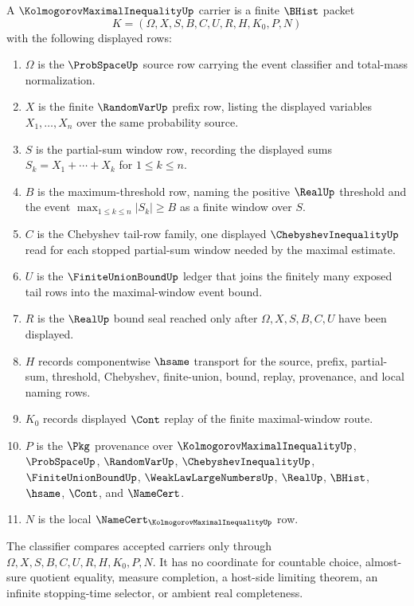 \begin{definition}
\label{def:kolmogorov-maximal-inequality-carrier}
A $\KolmogorovMaximalInequalityUp$ carrier is a finite $\BHist$ packet
$$
K=(\Omega,X,S,B,C,U,R,H,K_0,P,N)
$$
with the following displayed rows:
\begin{enumerate}
\item $\Omega$ is the $\ProbSpaceUp$ source row carrying the event classifier and total-mass normalization.
\item $X$ is the finite $\RandomVarUp$ prefix row, listing the displayed variables $X_1,\ldots,X_n$ over the same probability source.
\item $S$ is the partial-sum window row, recording the displayed sums $S_k=X_1+\cdots+X_k$ for $1\le k\le n$.
\item $B$ is the maximum-threshold row, naming the positive $\RealUp$ threshold and the event $\max_{1\le k\le n}|S_k|\ge B$ as a finite window over $S$.
\item $C$ is the Chebyshev tail-row family, one displayed $\ChebyshevInequalityUp$ read for each stopped partial-sum window needed by the maximal estimate.
\item $U$ is the $\FiniteUnionBoundUp$ ledger that joins the finitely many exposed tail rows into the maximal-window event bound.
\item $R$ is the $\RealUp$ bound seal reached only after $\Omega,X,S,B,C,U$ have been displayed.
\item $H$ records componentwise $\hsame$ transport for the source, prefix, partial-sum, threshold, Chebyshev, finite-union, bound, replay, provenance, and local naming rows.
\item $K_0$ records displayed $\Cont$ replay of the finite maximal-window route.
\item $P$ is the $\Pkg$ provenance over $\KolmogorovMaximalInequalityUp$, $\ProbSpaceUp$, $\RandomVarUp$, $\ChebyshevInequalityUp$, $\FiniteUnionBoundUp$, $\WeakLawLargeNumbersUp$, $\RealUp$, $\BHist$, $\hsame$, $\Cont$, and $\NameCert$.
\item $N$ is the local $\NameCert_{\KolmogorovMaximalInequalityUp}$ row.
\end{enumerate}
The classifier compares accepted carriers only through $\Omega,X,S,B,C,U,R,H,K_0,P,N$. It has no coordinate for countable choice, almost-sure quotient equality, measure completion, a host-side limiting theorem, an infinite stopping-time selector, or ambient real completeness.
\end{definition}

